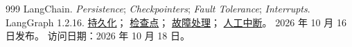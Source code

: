 \begin{thebibliography}{999}
LangChain. \textit{Persistence}; \textit{Checkpointers}; \textit{Fault Tolerance};
\textit{Interrupts}. LangGraph 1.2.16.
\href{https://docs.langchain.com/oss/python/langgraph/persistence}{持久化}；
\href{https://docs.langchain.com/oss/python/langgraph/checkpointers}{检查点}；
\href{https://docs.langchain.com/oss/python/langgraph/fault-tolerance}{故障处理}；
\href{https://docs.langchain.com/oss/python/langgraph/interrupts}{人工中断}。
2026 年 10 月 16 日发布。
访问日期：2026 年 10 月 18 日。

\end{thebibliography}
